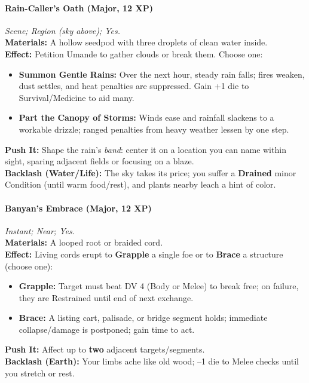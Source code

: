 \paragraph{Rain-Caller’s Oath (Major, 12 XP)} \emph{Scene; Region (sky above); Yes.}\\
\textbf{Materials:} A hollow seedpod with three droplets of clean water inside.\\
\textbf{Effect:} Petition Umande to gather clouds or break them. Choose one:
\begin{itemize}
  \item \textbf{Summon Gentle Rains:} Over the next hour, steady rain falls; fires weaken, dust settles, and heat penalties are suppressed. Gain +1 die to Survival/Medicine to aid many.
  \item \textbf{Part the Canopy of Storms:} Winds ease and rainfall slackens to a workable drizzle; ranged penalties from heavy weather lessen by one step.
\end{itemize}
\textbf{Push It:} Shape the rain’s \emph{band}: center it on a location you can name within sight, sparing adjacent fields or focusing on a blaze.\\
\textbf{Backlash (Water/Life):} The sky takes its price; you suffer a \textbf{Drained} minor Condition (until warm food/rest), and plants nearby leach a hint of color.

\paragraph{Banyan’s Embrace (Major, 12 XP)} \emph{Instant; Near; Yes.}\\
\textbf{Materials:} A looped root or braided cord.\\
\textbf{Effect:} Living cords erupt to \textbf{Grapple} a single foe or to \textbf{Brace} a structure (choose one):
\begin{itemize}
  \item \textbf{Grapple:} Target must beat DV 4 (Body or Melee) to break free; on failure, they are Restrained until end of next exchange.
  \item \textbf{Brace:} A listing cart, palisade, or bridge segment holds; immediate collapse/damage is postponed; gain time to act.
\end{itemize}
\textbf{Push It:} Affect up to \textbf{two} adjacent targets/segments.\\
\textbf{Backlash (Earth):} Your limbs ache like old wood; --1 die to Melee checks until you stretch or rest.

